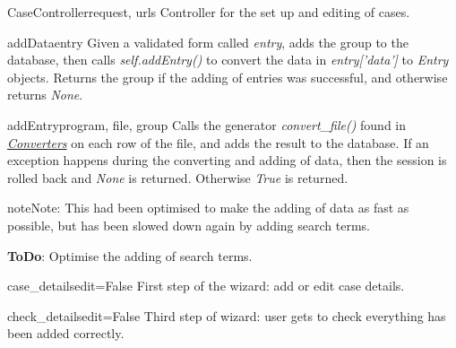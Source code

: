 \documentclass[letterpaper,10pt,english]{manual}
\begin{document}
\hypertarget{webscavator.controllers.caseController.CaseController}{}\begin{classdesc}{CaseController}{request, urls}
Controller for the set up and editing of cases.

\hypertarget{webscavator.controllers.caseController.CaseController.addData}{}\begin{methoddesc}{addData}{entry}
Given a validated form called \emph{entry}, adds the group to the database, 
then calls \emph{self.addEntry()} to convert the data in \emph{entry{[}'data'{]}} to \emph{Entry} objects. 
Returns the group if the adding of entries was successful, and otherwise
returns \emph{None}.
\end{methoddesc}

\hypertarget{webscavator.controllers.caseController.CaseController.addEntry}{}\begin{methoddesc}{addEntry}{program, file, group}
Calls the generator \emph{convert\_file()} found in \hyperlink{--doc-converters}{\emph{Converters}} on each row of the file, 
and adds the result to the database. If an exception happens during the converting and
adding of data, then the session is rolled back and \emph{None} is returned. Otherwise
\emph{True} is returned.

\begin{notice}{note}{Note:}
This had been optimised to make the adding of data as fast as possible, but
has been slowed down again by adding search terms.

\textbf{ToDo}: Optimise the adding of search terms.
\end{notice}
\end{methoddesc}

\hypertarget{webscavator.controllers.caseController.CaseController.case_details}{}\begin{methoddesc}{case\_details}{edit=False}
First step of the wizard: add or edit case details.
\end{methoddesc}

\hypertarget{webscavator.controllers.caseController.CaseController.check_details}{}\begin{methoddesc}{check\_details}{edit=False}
Third step of wizard: user gets to check everything has been added correctly.
\end{methoddesc}


\end{classdesc}
\end{document}
